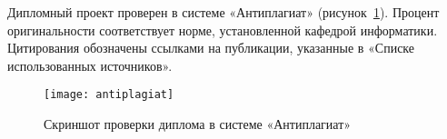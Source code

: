 Дипломный проект проверен в системе «Антиплагиат» (рисунок~\ref{fig:antiplagiat}). Процент оригинальности соответствует норме, установленной кафедрой информатики. Цитирования обозначены ссылками на публикации, указанные в «Списке использованных источников».

\begin{figure}[ht]
    \centering
    \texttt{[image: antiplagiat]}
    \renewcommand{\thefigure}{1}
    \caption{Скриншот проверки диплома в системе «Антиплагиат»}\label{fig:antiplagiat}
\end{figure}